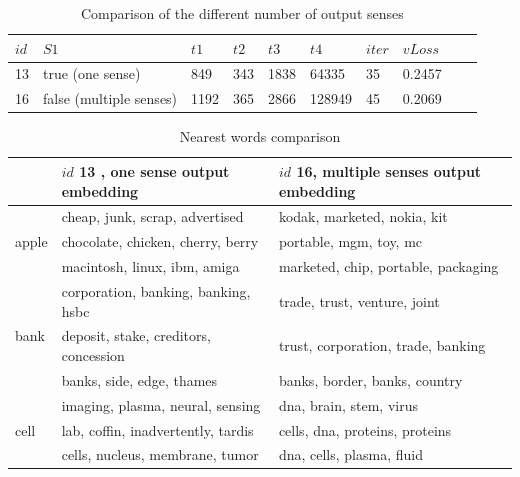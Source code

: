 \begin{table}[tb]

\caption{Comparison of the different number of output senses} \label{tab:group5} 
\begin{center}
\begin{tabular}{|l|l|l|l|l|l|l|l|l|l|}
\hline
$id$& $S1$ & $t1$ & $t2$ & $t3$ & $t4$ & $iter$ &    $vLoss$  	   \\ 
\hline
13	& true (one sense)		& 849	& 343	& 1838 &	64335 & 35& 0.2457 	   \\ 
\hline
16 	& false (multiple senses)& 1192	& 365	& 2866 &	128949 & 45& 0.2069  \\ 
\hline
\end{tabular}
\end{center}
\end{table}
 

\begin{table}[tb]
\caption{Nearest words comparison} \label{tab:nearestcompare} 

\begin{center}
\begin{tabular}{ |l|l|l| }
\hline
 & $id$ 13 , one sense output embedding& $id$ 16, multiple senses output embedding \\
\hline
\hline
\multirow{3}{*}{apple} 
 & cheap, junk, scrap, advertised 				& kodak, marketed, nokia, kit \\
 & chocolate, chicken, cherry, berry 		& portable, mgm, toy, mc \\
 & macintosh, linux, ibm, amiga			& marketed, chip, portable, packaging \\ 
 \hline
\multirow{3}{*}{bank} 
 & corporation, banking, banking, hsbc & trade, trust, venture, joint \\
 & deposit, stake, creditors, concession & trust, corporation, trade, banking \\ 
 & banks, side, edge, thames &  banks, border, banks, country \\ 
 \hline
\multirow{3}{*}{cell} 
 & imaging, plasma, neural, sensing & dna, brain, stem, virus \\
 & lab, coffin, inadvertently, tardis & cells, dna, proteins, proteins \\
 & cells, nucleus, membrane, tumor & dna, cells, plasma, fluid \\
\hline
\end{tabular}
\end{center}
\end{table}

